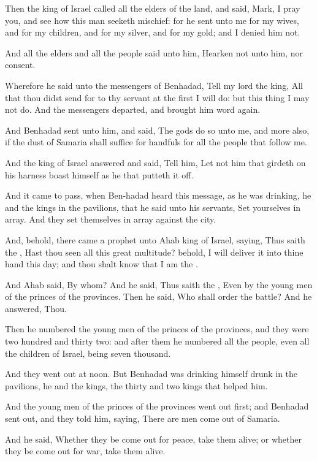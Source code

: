 \Verse Then the king of Israel called all the elders of the land, and said, Mark, I pray you, and see how this man seeketh mischief: for he sent unto me for my wives, and for my children, and for my silver, and for my gold; and I denied him not.

\Verse And all the elders and all the people said unto him, Hearken not unto him, nor consent.

\Verse Wherefore he said unto the messengers of Benhadad, Tell my lord the king, All that thou didst send for to thy servant at the first I will do: but this thing I may not do. And the messengers departed, and brought him word again.

\Verse And Benhadad sent unto him, and said, The gods do so unto me, and more also, if the dust of Samaria shall suffice for handfuls for all the people that follow me.

\Verse And the king of Israel answered and said, Tell him, Let not him that girdeth on his harness boast himself as he that putteth it off.

\Verse And it came to pass, when Ben-hadad heard this message, as he was drinking, he and the kings in the pavilions, that he said unto his servants, Set yourselves in array. And they set themselves in array against the city.

\Verse And, behold, there came a prophet unto Ahab king of Israel, saying, Thus saith the \LORD, Hast thou seen all this great multitude?  behold, I will deliver it into thine hand this day; and thou shalt know that I am the \LORD.

\Verse And Ahab said, By whom? And he said, Thus saith the \LORD, Even by the young men of the princes of the provinces. Then he said, Who shall order the battle? And he answered, Thou.

\Verse Then he numbered the young men of the princes of the provinces, and they were two hundred and thirty two: and after them he numbered all the people, even all the children of Israel, being seven thousand.

\Verse And they went out at noon. But Benhadad was drinking himself drunk in the pavilions, he and the kings, the thirty and two kings that helped him.

\Verse And the young men of the princes of the provinces went out first; and Benhadad sent out, and they told him, saying, There are men come out of Samaria.

\Verse And he said, Whether they be come out for peace, take them alive; or whether they be come out for war, take them alive.

